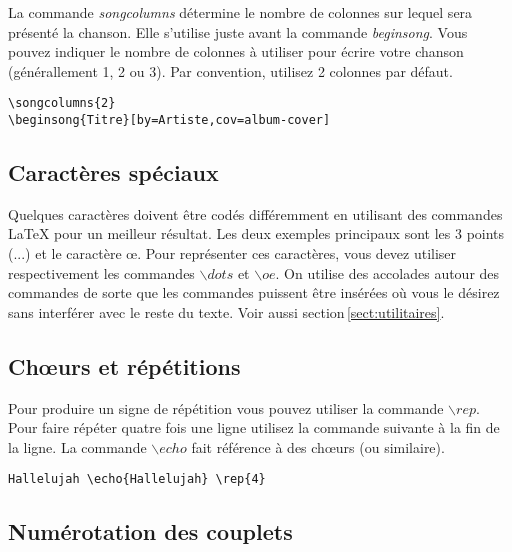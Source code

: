 \documentclass[a4paper,twoside]{article}
\begin{document}
La commande \emph{songcolumns} détermine le nombre de colonnes sur
lequel sera présenté la chanson. Elle s'utilise juste avant la
commande \emph{beginsong}. Vous pouvez indiquer le nombre de colonnes
à utiliser pour écrire votre chanson (générallement 1, 2 ou 3). Par
convention, utilisez 2 colonnes par défaut.

\begin{verbatim}
\songcolumns{2}
\beginsong{Titre}[by=Artiste,cov=album-cover]
\end{verbatim}

\subsection{Caractères spéciaux}

Quelques caractères doivent être codés différemment en utilisant des
commandes LaTeX pour un meilleur résultat. Les deux exemples
principaux sont les 3 points (...) et le caractère \oe{}. Pour
représenter ces caractères, vous devez utiliser respectivement les
commandes ${\backslash dots}$ et ${\backslash oe}$. On utilise des
accolades autour des commandes de sorte que les commandes puissent
être insérées où vous le désirez sans interférer avec le reste du
texte. Voir aussi section\,\ref{sect:utilitaires}.

\subsection{Ch\oe{}urs et répétitions}

Pour produire un signe de répétition vous pouvez utiliser la commande
$\backslash rep$. Pour faire répéter quatre fois une ligne utilisez la
commande suivante à la fin de la ligne. La commande $\backslash echo$
fait référence à des ch\oe{}urs (ou similaire).

\begin{verbatim}
Hallelujah \echo{Hallelujah} \rep{4}
\end{verbatim}

\subsection{Numérotation des couplets}
\end{document}
